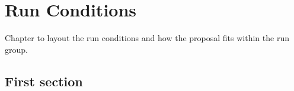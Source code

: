 \chapter{Run Conditions}
\label{chap:physics}

Chapter to layout the run conditions and how the proposal fits within
the run group.

\section{First section}


